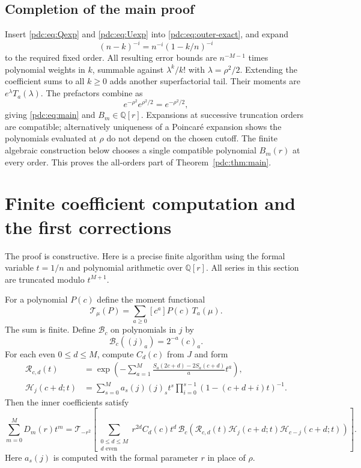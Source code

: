 \documentclass[11pt,letterpaper]{article}
\theoremstyle{remark}\newtheorem{remark}[theorem]{Remark}
\newcommand{\fall}[2]{(#1)_{#2}}
\newcommand{\Q}{\mathbb Q}
\begin{document}
\subsection{Completion of the main proof}
Insert \eqref{pdc:eq:Qexp} and \eqref{pdc:eq:Uexp} into \eqref{pdc:eq:outer-exact}, and expand
\[
 (n-k)^{-i}=n^{-i}(1-k/n)^{-i}
\]
to the required fixed order. All resulting error bounds are $n^{-M-1}$ times polynomial weights in $k$, summable against $\lambda^k/k!$ with $\lambda=\rho^2/2$. Extending the coefficient sums to all $k\geq0$ adds another superfactorial tail. Their moments are $e^\lambda T_a(\lambda)$. The prefactors combine as
\[
 e^{-\rho^2}e^{\rho^2/2}=e^{-\rho^2/2},
\]
giving \eqref{pdc:eq:main} and $B_m\in\Q[r]$. Expansions at successive truncation orders are compatible; alternatively uniqueness of a Poincar\'e expansion shows the polynomials evaluated at $\rho$ do not depend on the chosen cutoff. The finite algebraic construction below chooses a single compatible polynomial $B_m(r)$ at every order. This proves the all-orders part of Theorem~\ref{pdc:thm:main}.

\section{Finite coefficient computation and the first corrections}
\label{pdc:sec:algorithm}
The proof is constructive. Here is a precise finite algorithm using the formal variable $t=1/n$ and polynomial arithmetic over $\Q[r]$. All series in this section are truncated modulo $t^{M+1}$.

For a polynomial $P(c)$ define the moment functional
\[
 \mathcal T_\mu(P)=\sum_{a\geq0}[c^a]P(c)\,T_a(\mu).
\]
The sum is finite. Define $\mathcal B_c$ on polynomials in $j$ by
\[
 \mathcal B_c(\fall{j}{a})=2^{-a}\fall{c}{a}.
\]
For each even $0\leq d\leq M$, compute $C_d(c)$ from $J$ and form
\begin{align*}
 \mathcal R_{c,d}(t)
 &=\exp\left(-\sum_{a=1}^M
       \frac{S_a(2c+d)-2S_a(c+d)}a t^a\right),\\
 \mathcal H_j(c+d;t)
 &=\sum_{s=0}^M a_s(j)\fall{j}{s}t^s
      \prod_{i=0}^{s-1}(1-(c+d+i)t)^{-1}.
\end{align*}
Then the inner coefficients satisfy
\begin{equation}\label{pdc:eq:algorithm-D}
 \sum_{m=0}^M D_m(r)t^m
 =\mathcal T_{-r^2}\!\left[
 \sum_{\substack{0\leq d\leq M\\d\text{ even}}}
 r^{2d}C_d(c)t^d\,
 \mathcal B_c\!\left(\mathcal R_{c,d}(t)
 \mathcal H_j(c+d;t)\mathcal H_{c-j}(c+d;t)\right)\right].
\end{equation}
Here $a_s(j)$ is computed with the formal parameter $r$ in place of $\rho$.
\end{document}
